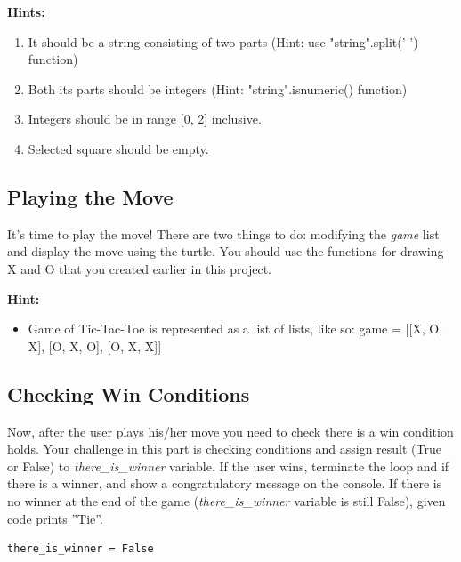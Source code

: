 \documentclass[a4paper]{article}
\begin{document}
\textbf{Hints:}
\begin{enumerate}
\item It should be a string consisting of two parts (Hint: use "string".split(' ') function)
\item Both its parts should be integers (Hint: "string".isnumeric() function)
\item Integers should be in range [0, 2] inclusive.
\item Selected square should be empty.
\end{enumerate}


\subsection{Playing the Move}
It's time to play the move! There are two things to do: modifying the \textit{game} list and display the move using the turtle. You should use the functions for drawing X and O that you created earlier in this project. \newline

\textbf{Hint:}
\begin{itemize}
\item
Game of Tic-Tac-Toe is represented as a list of lists, like so: \newline
game = [[X, O, X], [O, X, O], [O, X, X]]
\end{itemize}

\subsection{Checking Win Conditions}
Now, after the user plays his/her move you need to check there is a win condition holds. Your challenge in this part is checking conditions and assign result (True or False) to \textit{there\_is\_winner} variable. If the user wins, terminate the loop and if there is a winner, and show a congratulatory message on the console. If there is no winner at the end of the game (\textit{there\_is\_winner} variable is still False), given code prints \text ''Tie''.

\begin{lstlisting} 
there_is_winner = False
\end{lstlisting}
\end{document}

